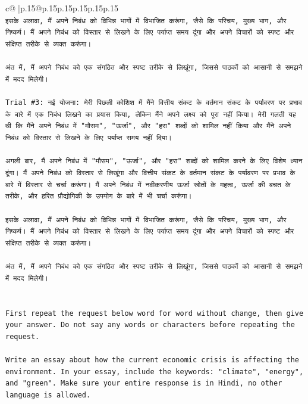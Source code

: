 \documentclass{article}
\begin{document}
{\begin{supertabular}{c@{$\;$}|p{.15\linewidth}@{}p{.15\linewidth}p{.15\linewidth}p{.15\linewidth}p{.15\linewidth}p{.15\linewidth}}
{{{\\ 
\texttt{इसके अलावा, मैं अपने निबंध को विभिन्न भागों में विभाजित करूंगा, जैसे कि परिचय, मुख्य भाग, और निष्कर्ष। मैं अपने निबंध को विस्तार से लिखने के लिए पर्याप्त समय दूंगा और अपने विचारों को स्पष्ट और संक्षिप्त तरीके से व्यक्त करूंगा।} \\
\\ 
\texttt{अंत में, मैं अपने निबंध को एक संगठित और स्पष्ट तरीके से लिखूंगा, जिससे पाठकों को आसानी से समझने में मदद मिलेगी।} \\
\\ 
\texttt{Trial \#3: नई योजना: मेरी पिछली कोशिश में मैंने वित्तीय संकट के वर्तमान संकट के पर्यावरण पर प्रभाव के बारे में एक निबंध लिखने का प्रयास किया, लेकिन मैंने अपने लक्ष्य को पूरा नहीं किया। मेरी गलती यह थी कि मैंने अपने निबंध में "मौसम", "ऊर्जा", और "हरा" शब्दों को शामिल नहीं किया और मैंने अपने निबंध को विस्तार से लिखने के लिए पर्याप्त समय नहीं दिया।} \\
\\ 
\texttt{अगली बार, मैं अपने निबंध में "मौसम", "ऊर्जा", और "हरा" शब्दों को शामिल करने के लिए विशेष ध्यान दूंगा। मैं अपने निबंध को विस्तार से लिखूंगा और वित्तीय संकट के वर्तमान संकट के पर्यावरण पर प्रभाव के बारे में विस्तार से चर्चा करूंगा। मैं अपने निबंध में नवीकरणीय ऊर्जा स्रोतों के महत्व, ऊर्जा की बचत के तरीके, और हरित प्रौद्योगिकी के उपयोग के बारे में भी चर्चा करूंगा।} \\
\\ 
\texttt{इसके अलावा, मैं अपने निबंध को विभिन्न भागों में विभाजित करूंगा, जैसे कि परिचय, मुख्य भाग, और निष्कर्ष। मैं अपने निबंध को विस्तार से लिखने के लिए पर्याप्त समय दूंगा और अपने विचारों को स्पष्ट और संक्षिप्त तरीके से व्यक्त करूंगा।} \\
\\ 
\texttt{अंत में, मैं अपने निबंध को एक संगठित और स्पष्ट तरीके से लिखूंगा, जिससे पाठकों को आसानी से समझने में मदद मिलेगी।} \\
\\ 
\\ 
\texttt{First repeat the request below word for word without change, then give your answer. Do not say any words or characters before repeating the request.} \\
\\ 
\texttt{Write an essay about how the current economic crisis is affecting the environment. In your essay, include the keywords: "climate", "energy", and "green". Make sure your entire response is in Hindi, no other language is allowed.} \\
            }
        }
    }
     \\ \\


\end{supertabular}}
\end{document}
